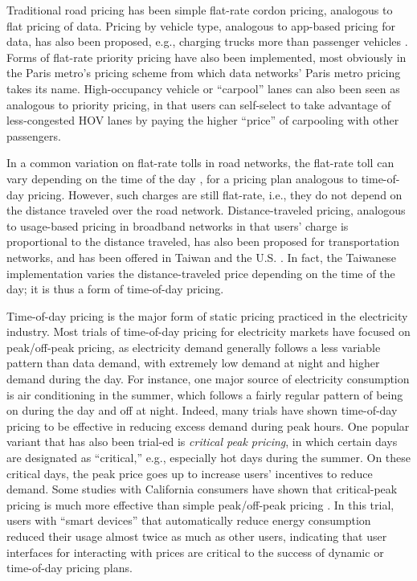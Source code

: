 Traditional road pricing has been simple flat-rate cordon pricing, analogous to flat pricing of data. Pricing by vehicle type, analogous to app-based pricing for data, has also been proposed, e.g., charging trucks more than passenger vehicles \cite{ushighways}. Forms of flat-rate priority pricing have also been implemented, most obviously in the Paris metro's pricing scheme from which data networks' Paris metro pricing takes its name. High-occupancy vehicle or ``carpool'' lanes can also been seen as analogous to priority pricing, in that users can self-select to take advantage of less-congested HOV lanes by paying the higher ``price'' of carpooling with other passengers.

In a common variation on flat-rate tolls in road networks, the flat-rate toll can vary depending on the time of the day \cite{RoadPricing}, for a pricing plan analogous to time-of-day pricing. However, such charges are still flat-rate, i.e., they do not depend on the distance traveled over the road network. Distance-traveled pricing, analogous to usage-based pricing in broadband networks in that users' charge is proportional to the distance traveled, has also been proposed for transportation networks, and has been offered in Taiwan and the U.S. \cite{holguin2006comparative,wen2005traveler}. In fact, the Taiwanese implementation varies the distance-traveled price depending on the time of the day; it is thus a form of time-of-day pricing.

Time-of-day pricing is the major form of static pricing practiced in the electricity industry. Most trials of time-of-day pricing for electricity markets have focused on peak/off-peak pricing, as electricity demand generally follows a less variable pattern than data demand, with extremely low demand at night and higher demand during the day. For instance, one major source of electricity consumption is air conditioning in the summer, which follows a fairly regular pattern of being on during the day and off at night. Indeed, many trials have shown time-of-day pricing to be effective in reducing excess demand during peak hours. One popular variant that has also been trial-ed is \emph{critical peak pricing}, in which certain days are designated as ``critical,'' e.g., especially hot days during the summer. On these critical days, the peak price goes up to increase users' incentives to reduce demand. Some studies with California consumers have shown that critical-peak pricing is much more effective than simple peak/off-peak pricing \cite{CharlesRiver,herter2007residential}. In this trial, users with ``smart devices'' that automatically reduce energy consumption reduced their usage almost twice as much as other users, indicating that user interfaces for interacting with prices are critical to the success of dynamic or time-of-day pricing plans.

